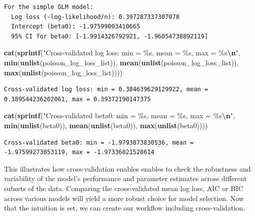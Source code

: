 \documentclass[
  english,
  11pt,
]{article}
\newenvironment{Shaded}{\begin{snugshade}}{\end{snugshade}}
\newcommand{\FunctionTok}[1]{\textcolor[rgb]{0.13,0.29,0.53}{\textbf{#1}}}
\newcommand{\NormalTok}[1]{#1}
\newcommand{\SpecialCharTok}[1]{\textcolor[rgb]{0.81,0.36,0.00}{\textbf{#1}}}
\newcommand{\StringTok}[1]{\textcolor[rgb]{0.31,0.60,0.02}{#1}}
\begin{document}
\begin{verbatim}
For the simple GLM model:
  Log loss (-log-likelihood/n): 0.397287337307078
  Intercept (beta0): -1.97599003410665
  95% CI for beta0: [-1.9914326792921, -1.96054738892119]
\end{verbatim}

\begin{Shaded}
\begin{Highlighting}[]
\FunctionTok{cat}\NormalTok{(}\FunctionTok{sprintf}\NormalTok{(}\StringTok{"Cross{-}validated log loss: min = \%s, mean = \%s, max = \%s}\SpecialCharTok{\textbackslash{}n}\StringTok{"}\NormalTok{, }\FunctionTok{min}\NormalTok{(}\FunctionTok{unlist}\NormalTok{(poisson\_log\_loss\_list)), }\FunctionTok{mean}\NormalTok{(}\FunctionTok{unlist}\NormalTok{(poisson\_log\_loss\_list)), }\FunctionTok{max}\NormalTok{(}\FunctionTok{unlist}\NormalTok{(poisson\_log\_loss\_list))))}
\end{Highlighting}
\end{Shaded}

\begin{verbatim}
Cross-validated log loss: min = 0.384639629129922, mean = 0.389544236202061, max = 0.39372190147375
\end{verbatim}

\begin{Shaded}
\begin{Highlighting}[]
\FunctionTok{cat}\NormalTok{(}\FunctionTok{sprintf}\NormalTok{(}\StringTok{"Cross{-}validated beta0: min = \%s, mean = \%s, max = \%s}\SpecialCharTok{\textbackslash{}n}\StringTok{"}\NormalTok{, }\FunctionTok{min}\NormalTok{(}\FunctionTok{unlist}\NormalTok{(beta0)), }\FunctionTok{mean}\NormalTok{(}\FunctionTok{unlist}\NormalTok{(beta0)), }\FunctionTok{max}\NormalTok{(}\FunctionTok{unlist}\NormalTok{(beta0))))}
\end{Highlighting}
\end{Shaded}

\begin{verbatim}
Cross-validated beta0: min = -1.9793873830536, mean = -1.97599273053119, max = -1.97336821528614
\end{verbatim}

This illustrates how cross-validation enables enables to check the
robustness and variability of the model's performance and parameter
estimates across different subsets of the data. Comparing the
cross-validated mean log loss, AIC or BIC across various models will
yield a more robust choice for model selection. Now that the intuition
is set, we can create our workflow including cross-validation.
\end{document}
